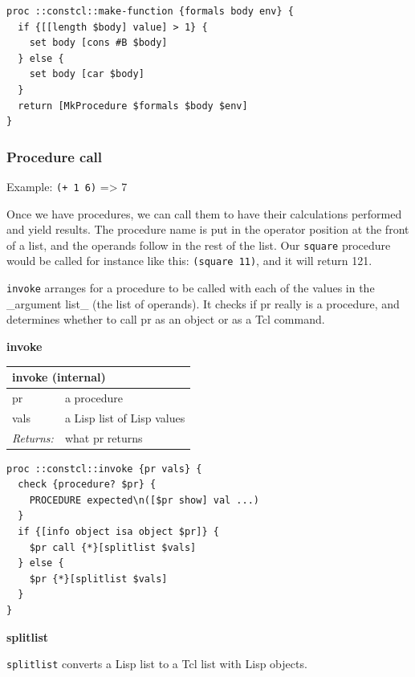 \documentclass[twoside,9pt]{report}
\begin{document}
\noindent\makebox[\linewidth]{\rule{\linewidth}{0.4pt}}
\begin{lstlisting}
proc ::constcl::make-function {formals body env} {
  if {[[length $body] value] > 1} {
    set body [cons #B $body]
  } else {
    set body [car $body]
  }
  return [MkProcedure $formals $body $env]
}
\end{lstlisting}
\noindent\makebox[\linewidth]{\rule{\linewidth}{0.4pt}}
\subsubsection{Procedure call}
\label{procedure-call}

Example: \texttt{(+ 1 6)} => 7


Once we have procedures, we can call them to have their calculations performed and yield results. The procedure name is put in the operator position at the front of a list, and the operands follow in the rest of the list. Our \texttt{square} procedure would be called for instance like this: \texttt{(square 11)}, and it will return 121.


\texttt{invoke} arranges for a procedure to be called with each of the values in the \_argument list\_ (the list of operands). It checks if pr really is a procedure, and determines whether to call pr as an object or as a Tcl command.


\textbf{invoke}

\begin{tabular}{ |l l| }
\hline
\multicolumn{2}{|l|}{invoke (internal)} \\
\hline
pr & a procedure \\
vals & a Lisp list of Lisp values \\
\textit{Returns:} & what pr returns \\
\hline
\end{tabular}

\noindent\makebox[\linewidth]{\rule{\linewidth}{0.4pt}}
\begin{lstlisting}
proc ::constcl::invoke {pr vals} {
  check {procedure? $pr} {
    PROCEDURE expected\n([$pr show] val ...)
  }
  if {[info object isa object $pr]} {
    $pr call {*}[splitlist $vals]
  } else {
    $pr {*}[splitlist $vals]
  }
}
\end{lstlisting}
\noindent\makebox[\linewidth]{\rule{\linewidth}{0.4pt}}

\textbf{splitlist}


\texttt{splitlist} converts a Lisp list to a Tcl list with Lisp objects.
\end{document}
